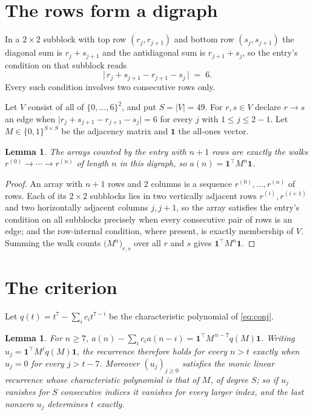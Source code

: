 \documentclass[11pt,a4paper]{article}
\theoremstyle{plain}
\newtheorem{lemma}[theorem]{Lemma}
\theoremstyle{definition}
\begin{document}
\section{The rows form a digraph}

In a $2\times2$ subblock with top row $(r_j,r_{j+1})$ and bottom row $(s_j,s_{j+1})$ the
diagonal sum is $r_j+s_{j+1}$ and the antidiagonal sum is $r_{j+1}+s_j$, so the entry's
condition on that subblock reads
\[
\bigl|\,r_j+s_{j+1}-r_{j+1}-s_j\,\bigr|\;=\;6.
\]
Every such condition involves two consecutive rows only.

Let $V$ consist of all of $\{0,\dots,6\}^{2}$, and put $S=|V|=49$. For $r,s\in V$ declare $r\to s$ an edge
when $\bigl|r_j+s_{j+1}-r_{j+1}-s_j\bigr|=6$ for every $j$ with
$1\le j\le2-1$. Let $M\in\{0,1\}^{S\times S}$ be the adjacency matrix and $\mathbf{1}$
the all-ones vector.

\begin{lemma}\label{lem:walk}
The arrays counted by the entry with $n+1$ rows are exactly the walks
$r^{(0)}\to\cdots\to r^{(n)}$ of length $n$ in this digraph, so
$a(n)=\mathbf{1}^{\!\top}M^{n}\mathbf{1}$.
\end{lemma}

\begin{proof}
An array with $n+1$ rows and $2$ columns is a sequence $r^{(0)},\dots,r^{(n)}$ of
rows. Each of its $2\times2$ subblocks lies in two vertically adjacent rows
$r^{(i)},r^{(i+1)}$ and two horizontally adjacent columns $j,j+1$, so the array satisfies
the entry's condition on all subblocks precisely when every consecutive pair of rows is an
edge; and the row-internal condition, where present, is exactly membership of $V$. Summing
the walk counts $\bigl(M^{n}\bigr)_{r,s}$ over all $r$ and $s$ gives
$\mathbf{1}^{\!\top}M^{n}\mathbf{1}$.
\end{proof}

\section{The criterion}

Let $q(t)=t^{7}-\sum_i c_i t^{7-i}$ be the characteristic polynomial of
\eqref{eq:conj}.

\begin{lemma}\label{lem:crit}
For $n\ge7$,
$a(n)-\sum_i c_i a(n-i)=\mathbf{1}^{\!\top}M^{\,n-7}q(M)\mathbf{1}$. Writing
$u_j=\mathbf{1}^{\!\top}M^{j}q(M)\mathbf{1}$, the recurrence therefore holds for every
$n>t$ exactly when $u_j=0$ for every $j>t-7$. Moreover $(u_j)_{j\ge0}$ satisfies the
monic linear recurrence whose characteristic polynomial is that of $M$, of degree $S$; so
if $u_j$ vanishes for $S$ consecutive indices it vanishes for every larger index, and the
last nonzero $u_j$ determines $t$ exactly.
\end{lemma}
\end{document}
